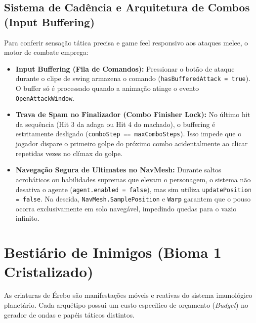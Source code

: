 \documentclass[a4paper,12pt]{report}
\begin{document}
\section{Sistema de Cadência e Arquitetura de Combos (Input Buffering)}
Para conferir sensação tática precisa e game feel responsivo aos ataques melee, o motor de combate emprega:
\begin{itemize}
    \item \textbf{Input Buffering (Fila de Comandos):} Pressionar o botão de ataque durante o clipe de swing armazena o comando (\texttt{hasBufferedAttack = true}). O buffer só é processado quando a animação atinge o evento \texttt{OpenAttackWindow}.
    \item \textbf{Trava de Spam no Finalizador (Combo Finisher Lock):} No último hit da sequência (Hit 3 da adaga ou Hit 4 do machado), o buffering é estritamente desligado (\texttt{comboStep == maxComboSteps}). Isso impede que o jogador dispare o primeiro golpe do próximo combo acidentalmente ao clicar repetidas vezes no clímax do golpe.
    \item \textbf{Navegação Segura de Ultimates no NavMesh:} Durante saltos acrobáticos ou habilidades supremas que elevam o personagem, o sistema não desativa o agente (\texttt{agent.enabled = false}), mas sim utiliza \texttt{updatePosition = false}. Na descida, \texttt{NavMesh.SamplePosition} e \texttt{Warp} garantem que o pouso ocorra exclusivamente em solo navegável, impedindo quedas para o vazio infinito.
\end{itemize}

\chapter{Bestiário de Inimigos (Bioma 1 Cristalizado)}\label{cap:bestiario}

As criaturas de Érebo são manifestações móveis e reativas do sistema imunológico planetário. Cada arquétipo possui um custo específico de orçamento (\textit{Budget}) no gerador de ondas e papéis táticos distintos.
\end{document}
